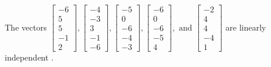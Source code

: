\begin{exercise}
\begin{exerciseStatement}
  \end{exerciseStatement}
  \begin{exerciseAnswer}
   The vectors \(\left[\begin{array}{r}
-6 \\
5 \\
5 \\
-1 \\
2
\end{array}\right] , \left[\begin{array}{r}
-4 \\
-3 \\
3 \\
-1 \\
-6
\end{array}\right] , \left[\begin{array}{r}
-5 \\
0 \\
-6 \\
-4 \\
-3
\end{array}\right] , \left[\begin{array}{r}
-6 \\
0 \\
-6 \\
-5 \\
4
\end{array}\right] , \text{ and } \left[\begin{array}{r}
-2 \\
4 \\
4 \\
-4 \\
1
\end{array}\right]\) are 
  	 linearly independent  .
  


  \end{exerciseAnswer}
\end{exercise}